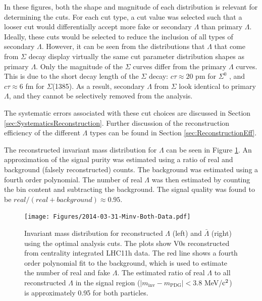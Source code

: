 In these figures, both the shape and magnitude of each distribution is relevant for determining the cuts. For each cut type, a cut value was selected such that a looser cut would differentially accept more fake or secondary $\Lambda$ than primary $\Lambda$. Ideally, these cuts would be selected to reduce the inclusion of all types of secondary $\Lambda$.  However, it can be seen from the distributions that $\Lambda$ that come from $\Sigma$ decay display virtually the same cut parameter distribution shapes as primary $\Lambda$.  Only the magnitude of the $\Sigma$ curves differ from the primary $\Lambda$ curves.  This is due to the short decay length of the $\Sigma$ decay: $c\tau \approx 20$ pm for $\Sigma^0$ , and $c\tau \approx 6$ fm for $\Sigma$(1385). As a result, secondary $\Lambda$ from $\Sigma$ look identical to primary $\Lambda$, and they cannot be selectively removed from the analysis.

The systematic errors associated with these cut choices are discussed in Section \ref{sec:SystematicsReconstruction}. Further discussion of the reconstruction efficiency of the different $\Lambda$ types can be found in Section \ref{sec:ReconstructionEff}.

The reconstructed invariant mass distribution for $\Lambda$ can be seen in Figure \ref{fig:BothInvMass}. An approximation of the signal purity was estimated using a ratio of real and background (falsely reconstructed) counts.  The background was estimated using a fourth order polynomial.  The number of real $\Lambda$ was then estimated by counting the bin content and subtracting the background. The signal quality was found to be $real/(real + background) \approx 0.95$.

\begin{figure}[hbtp]
\texttt{[image: Figures/2014-03-31-Minv-Both-Data.pdf]}
\caption[$\Lambda$ and $\bar{\Lambda}$ invariant mass distributions]{Invariant mass distribution for reconstructed $\Lambda$ (left) and $\bar{\Lambda}$ (right) using the optimal analysis cuts.  The plots show V0s reconstructed from centrality integrated LHC11h data.  The red line shows a fourth order polynomial fit to the background, which is used to estimate the number of real and fake $\Lambda$.  The estimated ratio of real $\Lambda$ to all reconstructed $\Lambda$ in the signal region ($ \lvert m_{\mathrm{inv}} - m_{\mathrm{PDG}}\rvert < 3.8$ MeV/$\rm c^2$) is approximately 0.95 for both particles.}
\label{fig:BothInvMass}
\end{figure}

